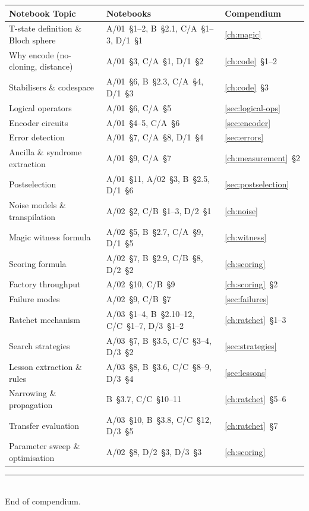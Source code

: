\documentclass[11pt,a4paper,twoside]{report}
\theoremstyle{definition}
\begin{document}
\begin{center}
\renewcommand{\arraystretch}{1.3}
\begin{tabular}{p{5.2cm}p{3.6cm}l}
\toprule
\textbf{Notebook Topic} & \textbf{Notebooks} & \textbf{Compendium} \\
\midrule
T-state definition \& Bloch sphere &
  A/01~\S1--2, B~\S2.1, C/A~\S1--3, D/1~\S1 &
  \cref{ch:magic} \\
Why encode (no-cloning, distance) &
  A/01~\S3, C/A~\S1, D/1~\S2 &
  \cref{ch:code}~\S1--2 \\
Stabilisers \& codespace &
  A/01~\S6, B~\S2.3, C/A~\S4, D/1~\S3 &
  \cref{ch:code}~\S3 \\
Logical operators &
  A/01~\S6, C/A~\S5 &
  \cref{sec:logical-ops} \\
Encoder circuits &
  A/01~\S4--5, C/A~\S6 &
  \cref{sec:encoder} \\
Error detection &
  A/01~\S7, C/A~\S8, D/1~\S4 &
  \cref{sec:errors} \\
Ancilla \& syndrome extraction &
  A/01~\S9, C/A~\S7 &
  \cref{ch:measurement}~\S2 \\
Postselection &
  A/01~\S11, A/02~\S3, B~\S2.5, D/1~\S6 &
  \cref{sec:postselection} \\
Noise models \& transpilation &
  A/02~\S2, C/B~\S1--3, D/2~\S1 &
  \cref{ch:noise} \\
Magic witness formula &
  A/02~\S5, B~\S2.7, C/A~\S9, D/1~\S5 &
  \cref{ch:witness} \\
Scoring formula &
  A/02~\S7, B~\S2.9, C/B~\S8, D/2~\S2 &
  \cref{ch:scoring} \\
Factory throughput &
  A/02~\S10, C/B~\S9 &
  \cref{ch:scoring}~\S2 \\
Failure modes &
  A/02~\S9, C/B~\S7 &
  \cref{sec:failures} \\
Ratchet mechanism &
  A/03~\S1--4, B~\S2.10--12, C/C~\S1--7, D/3~\S1--2 &
  \cref{ch:ratchet}~\S1--3 \\
Search strategies &
  A/03~\S7, B~\S3.5, C/C~\S3--4, D/3~\S2 &
  \cref{sec:strategies} \\
Lesson extraction \& rules &
  A/03~\S8, B~\S3.6, C/C~\S8--9, D/3~\S4 &
  \cref{sec:lessons} \\
Narrowing \& propagation &
  B~\S3.7, C/C~\S10--11 &
  \cref{ch:ratchet}~\S5--6 \\
Transfer evaluation &
  A/03~\S10, B~\S3.8, C/C~\S12, D/3~\S5 &
  \cref{ch:ratchet}~\S7 \\
Parameter sweep \& optimisation &
  A/02~\S8, D/2~\S3, D/3~\S3 &
  \cref{ch:scoring} \\
\bottomrule
\end{tabular}
\end{center}

\vfill
\begin{center}
\rule{0.3\textwidth}{0.4pt}\\[0.5em]
{\small End of compendium.}
\end{center}
\end{document}
